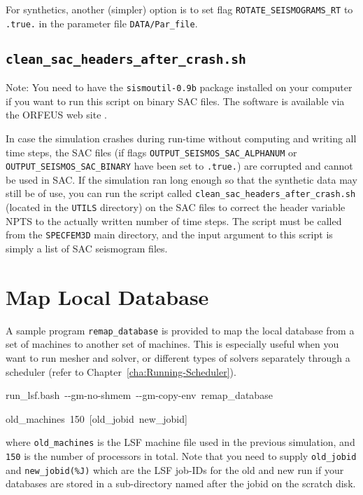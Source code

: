 For synthetics, another (simpler) option is to set flag \texttt{ROTATE\_SEISMOGRAMS\_RT}
to \texttt{.true.} in the parameter file \texttt{DATA/Par\_file}.


\subsection{\texttt{clean\_sac\_headers\_after\_crash.sh}}

Note: You need to have the \texttt{sismoutil-0.9b} package installed
on your computer if you want to run this script on binary SAC files.
The software is available via the ORFEUS web site .

In case the simulation crashes during run-time without computing and
writing all time steps, the SAC files (if flags \texttt{OUTPUT\_SEISMOS\_SAC\_ALPHANUM}
or \texttt{OUTPUT\_SEISMOS\_SAC\_BINARY} have been set to \texttt{.true.})
are corrupted and cannot be used in SAC. If the simulation
ran long enough so that the synthetic data may still be of use, you
can run the script called \texttt{clean\_sac\_headers\_after\_crash.sh}
(located in the \texttt{UTILS} directory) on the SAC files to correct
the header variable NPTS to the actually written number of time steps.
The script must be called from the \texttt{SPECFEM3D} main directory,
and the input argument to this script is simply a list of SAC seismogram
files.


\section{Map Local Database}

A sample program \texttt{remap\_database} is provided to map the local
database from a set of machines to another set of machines. This is
especially useful when you want to run mesher and solver, or different
types of solvers separately through a scheduler (refer to Chapter~\ref{cha:Running-Scheduler}).

\begin{lyxcode}
run\_lsf.bash~-{}-gm-no-shmem~-{}-gm-copy-env~remap\_database

old\_machines~150~{[}old\_jobid~new\_jobid]
\end{lyxcode}
where \texttt{old\_machines} is the LSF machine file used in the previous
simulation, and \texttt{150} is the number of processors in total.
Note that you need to supply \texttt{old\_jobid} and \texttt{new\_jobid(\%J)}
which are the LSF job-IDs for the old and new run if your databases
are stored in a sub-directory named after the jobid on the scratch
disk.




